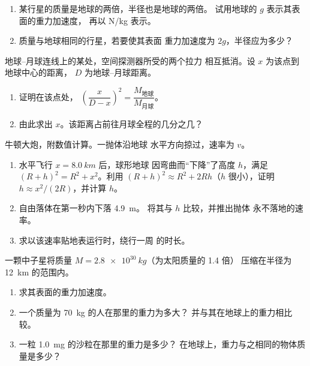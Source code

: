 \begin{exercise}[$\star\star$]\label{exo:g10:universal-gravitation:11}
\begin{enumerate}
  \item 某行星的质量是地球的两倍，半径也是地球的两倍。
        试用地球的 $g$ 表示其表面的重力加速度，
        再以 \unit{N/kg} 表示。
  \item 质量与地球相同的行星，若要使其表面
        重力加速度为 $2g$，半径应为多少？
\end{enumerate}
\end{exercise}

\begin{exercise}[$\star\star\star$]\label{exo:g10:universal-gravitation:12}
地球--月球连线上的某处，空间探测器所受的两个拉力
相互抵消。设 $x$ 为该点到地球中心的距离，
$D$ 为地球--月球距离。
\begin{enumerate}
  \item 证明在该点处，
        $\left(\dfrac{x}{D - x}\right)^{2}
        = \dfrac{M_{\text{地球}}}{M_{\text{月球}}}$。
  \item 由此求出 $x$。该距离占前往月球全程的几分之几？
\end{enumerate}
\end{exercise}

\begin{exercise}[$\star\star\star$]\label{exo:g10:universal-gravitation:13}
牛顿大炮，附数值计算。一抛体沿地球
水平方向掠过，速率为 $v$。
\begin{enumerate}
  \item 水平飞行 $x = \qty{8.0}{km}$ 后，球形地球
        因弯曲而“下降”了高度 $h$，满足
        $(R + h)^2 = R^2 + x^2$。利用
        $(R + h)^2 \approx R^2 + 2Rh$（$h$ 很小），证明
        $h \approx x^2 / (2R)$，并计算 $h$。
  \item 自由落体在第一秒内下落 \qty{4.9}{m}。
        将其与 $h$ 比较，并推出抛体
        永不落地的速率。
  \item 求以该速率贴地表运行时，绕行一周
        的时长。
\end{enumerate}
\end{exercise}

\begin{exercise}[$\star\star\star$]\label{exo:g10:universal-gravitation:14}
一颗中子星将质量 $M = \qty{2.8e30}{kg}$（为太阳质量的 1.4 倍）
压缩在半径为 \qty{12}{km} 的范围内。
\begin{enumerate}
  \item 求其表面的重力加速度。
  \item 一个质量为 \qty{70}{kg} 的人在那里的重力为多大？
        并与其在地球上的重力相比较。
  \item 一粒 \qty{1.0}{mg} 的沙粒在那里的重力是多少？
        在地球上，重力与之相同的物体质量是多少？
\end{enumerate}
\end{exercise}

